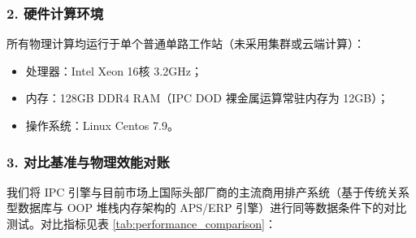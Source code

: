 \documentclass[11pt,a4paper]{article}
\begin{document}
\subsubsection*{2. 硬件计算环境}
所有物理计算均运行于单个普通单路工作站（未采用集群或云端计算）：
\begin{itemize}
    \item 处理器：Intel Xeon 16核 3.2GHz；
    \item 内存：128GB DDR4 RAM（IPC DOD 裸金属运算常驻内存为 12GB）；
    \item 操作系统：Linux Centos 7.9。
\end{itemize}

\subsubsection*{3. 对比基准与物理效能对账}
我们将 IPC 引擎与目前市场上国际头部厂商的主流商用排产系统（基于传统关系型数据库与 OOP 堆栈内存架构的 APS/ERP 引擎）进行同等数据条件下的对比测试。对比指标见表 \ref{tab:performance_comparison}：
\end{document}

